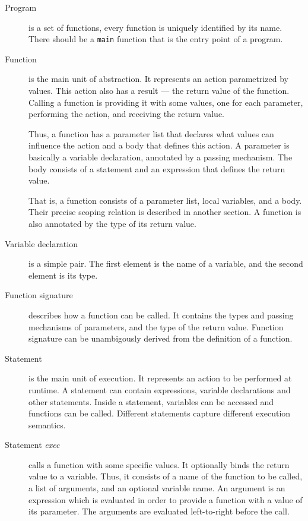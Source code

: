 \documentclass [a4paper] {article}
\begin{document}
\begin {description}

\item [Program] is a set of functions, every function is uniquely identified by
its name. There should be a \texttt{main} function that is the entry point of a
program.

\item [Function] is the main unit of abstraction. It represents an action
parametrized by values. This action also has a result --- the return value of
the function. Calling a function is providing it with some values, one for each
parameter, performing the action, and receiving the return value.

Thus, a function has a parameter list that declares what values can influence
the action and a body that defines this action. A parameter is basically a
variable declaration, annotated by a passing mechanism. The body consists of a
statement and an expression that defines the return value.

That is, a function consists of a parameter list, local variables, and a body.
Their precise scoping relation is described in another section. A function is
also annotated by the type of its return value.

\item [Variable declaration] is a simple pair. The first element is the name
of a variable, and the second element is its type.

\item [Function signature] describes how a function can be called. It contains
the types and passing mechanisms of parameters, and the type of the return
value. Function signature can be unambigously derived from the definition of a
function.

\item [Statement] is the main unit of execution. It represents an action to be
performed at runtime. A statement can contain expressions, variable declarations
and other statements. Inside a statement, variables can be accessed and
functions can be called. Different statements capture different execution
semantics.

\item [Statement \emph{exec}] calls a function with some specific values. It
optionally binds the return value to a variable. Thus, it consists of a name of
the function to be called, a list of arguments, and an optional variable name.
An argument is an expression which is evaluated in order to provide a function
with a value of its parameter. The arguments are evaluated left-to-right before
the call.


\end{description}
\end{document}
